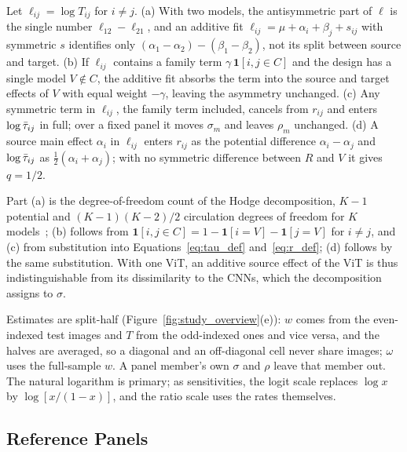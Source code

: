 \begin{proposition}[Identifiability]
\label{prop:identifiability}
Let $\ell_{ij} = \log T_{ij}$ for $i \neq j$. (a) With two models, the antisymmetric part of $\ell$ is the single number $\ell_{12} - \ell_{21}$, and an additive fit $\ell_{ij} = \mu + \alpha_i + \beta_j + s_{ij}$ with symmetric $s$ identifies only $(\alpha_1 - \alpha_2) - (\beta_1 - \beta_2)$, not its split between source and target. (b) If $\ell_{ij}$ contains a family term $\gamma\,\mathbf{1}[i,j \in C]$ and the design has a single model $V \notin C$, the additive fit absorbs the term into the source and target effects of $V$ with equal weight $-\gamma$, leaving the asymmetry unchanged. (c) Any symmetric term in $\ell_{ij}$, the family term included, cancels from $r_{ij}$ and enters $\log\bar{\tau}_{ij}$ in full; over a fixed panel it moves $\sigma_m$ and leaves $\rho_m$ unchanged. (d) A source main effect $\alpha_i$ in $\ell_{ij}$ enters $r_{ij}$ as the potential difference $\alpha_i - \alpha_j$ and $\log\bar{\tau}_{ij}$ as $\tfrac12(\alpha_i+\alpha_j)$; with no symmetric difference between $R$ and $V$ it gives $q = 1/2$.
\end{proposition}

Part (a) is the degree-of-freedom count of the Hodge decomposition, $K-1$ potential and $(K-1)(K-2)/2$ circulation degrees of freedom for $K$ models~\cite{jiang2011statistical}; (b) follows from $\mathbf{1}[i,j\in C] = 1 - \mathbf{1}[i=V] - \mathbf{1}[j=V]$ for $i\neq j$, and (c) from substitution into Equations~\eqref{eq:tau_def} and~\eqref{eq:r_def}; (d) follows by the same substitution. With one ViT, an additive source effect of the ViT is thus indistinguishable from its dissimilarity to the CNNs, which the decomposition assigns to $\sigma$.

Estimates are split-half (Figure~\ref{fig:study_overview}(e)): $w$ comes from the even-indexed test images and $T$ from the odd-indexed ones and vice versa, and the halves are averaged, so a diagonal and an off-diagonal cell never share images; $\omega$ uses the full-sample $w$. A panel member's own $\sigma$ and $\rho$ leave that member out. The natural logarithm is primary; as sensitivities, the logit scale replaces $\log x$ by $\log[x/(1-x)]$, and the ratio scale uses the rates themselves.

\subsection{Reference Panels}
\label{subsec:panels}

